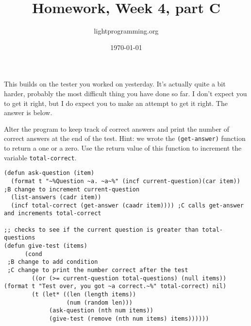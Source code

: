 \documentclass{article}
\title{Homework, Week 4, part C}
\author{lightprogramming.org}
\date{\today}
\begin{document}
\maketitle{}

This builds on the tester you worked on yesterday. It's actually quite a bit harder, probably the most difficult thing you have done so far. I don't expect you to get it right, but I do expect you to make an attempt to get it right. The answer is below.

Alter the program to keep track of correct answers and print the number of correct answers at the end of the test. Hint: we wrote the \texttt{(get-answer)} function to return a one or a zero. Use the return value of this function to increment the variable \texttt{total-correct}.

\lstset{language=Lisp,numbers=left,keepspaces=false,basicstyle=\small,numberstyle=\tiny,breaklines=true,showstringspaces=false}
\begin{lstlisting}
(defun ask-question (item)
  (format t "~%Question ~a. ~a~%" (incf current-question)(car item)) ;B change to increment current-question
  (list-answers (cadr item))
  (incf total-correct (get-answer (caadr item)))) ;C calls get-answer and increments total-correct

;; checks to see if the current question is greater than total-questions
(defun give-test (items)
      (cond
 ;B change to add condition
 ;C change to print the number correct after the test
        ((or (>= current-question total-questions) (null items)) (format t "Test over, you got ~a correct.~%" total-correct) nil)
        (t (let* ((len (length items))
                  (num (random len)))
             (ask-question (nth num items))
             (give-test (remove (nth num items) items))))))
\end{lstlisting}
\end{document}

